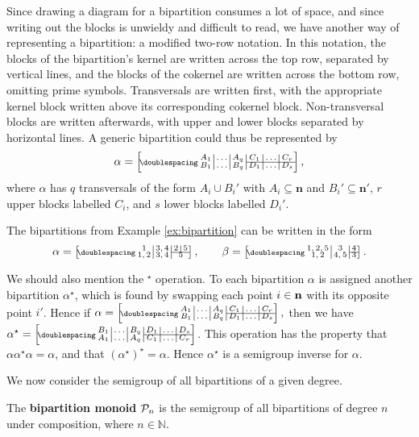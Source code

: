 Since drawing a diagram for a bipartition consumes a lot of space, and since
writing out the blocks is unwieldy and difficult to read, we have another way of
representing a bipartition: a modified two-row notation.  In this notation, the
blocks of the bipartition's kernel are written across the top row, separated by
vertical lines, and the blocks of the cokernel are written across the bottom
row, omitting prime symbols.  Transversals are written first, with the
appropriate kernel block written above its corresponding cokernel block.
Non-transversal blocks are written afterwards, with upper and lower blocks
separated by horizontal lines.  A generic bipartition could thus be represented
by
$$\alpha = \bipart{c|c|c|c|c|c}{4-6}
{A_1 & \ldots & A_q & C_1 & \ldots & C_r}
{B_1 & \ldots & B_q & D_1 & \ldots & D_s},$$
where $\alpha$ has $q$ transversals of the form $A_i \cup B_i'$ with
$A_i \subseteq \mathbf{n}$ and $B_i' \subseteq \mathbf{n}'$, $r$ upper blocks
labelled $C_i$, and $s$ lower blocks labelled $D_i'$.

\begin{example}
  \label{ex:bipartition-two-row}
  The bipartitions from Example \ref{ex:bipartition} can be written in the form
  $$\alpha = \bipart{c|c|c|c}{3-4}
  {1 & 3,4 & 2 & 5} {1,2 & 3,4 & \mc{2}{c}{5}}, \qquad
  \beta = \bipart{c|c|c}{3-3}{1,2,5 & 3 & 4}{1,2 & 4,5 & 3}.$$
\end{example}

We should also mention the $^\star$ operation.
 To each bipartition
$\alpha$ is assigned another bipartition $\alpha^\star$, which is found by
swapping each point $i \in \mathbf{n}$ with its opposite point $i'$.  Hence if
$\alpha = \bipart{c|c|c|c|c|c}{4-6}
{A_1 & \ldots & A_q & C_1 & \ldots & C_r}
{B_1 & \ldots & B_q & D_1 & \ldots & D_s},$ then we have
$\alpha^\star = \bipart{c|c|c|c|c|c}{4-6}
{B_1 & \ldots & B_q & D_1 & \ldots & D_s}
{A_1 & \ldots & A_q & C_1 & \ldots & C_r}$.
This operation has the property that $\alpha \alpha^\star \alpha = \alpha$, and
that $(\alpha^\star)^\star = \alpha$.  Hence $\alpha^\star$ is a semigroup
inverse for $\alpha$.

We now consider the semigroup of all bipartitions of a given degree.

\begin{definition}
  \label{def:pn}
  The \textbf{bipartition monoid} $\mathcal{P}_n$ is the semigroup of all bipartitions
  of degree $n$ under composition, where $n \in \mathbb{N}$.
\end{definition}

